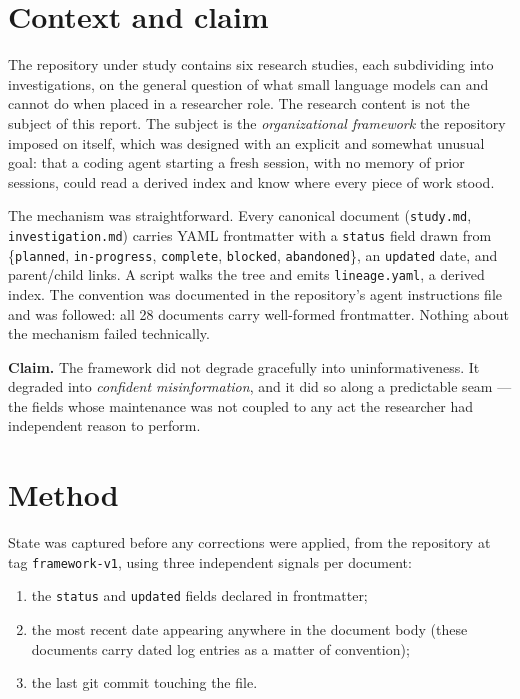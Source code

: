 \documentclass[11pt]{article}
\begin{document}
\section{Context and claim}

The repository under study contains six research studies, each subdividing
into investigations, on the general question of what small language models
can and cannot do when placed in a researcher role. The research content is
not the subject of this report. The subject is the \emph{organizational
framework} the repository imposed on itself, which was designed with an
explicit and somewhat unusual goal: that a coding agent starting a fresh
session, with no memory of prior sessions, could read a derived index and
know where every piece of work stood.

The mechanism was straightforward. Every canonical document
(\texttt{study.md}, \texttt{investigation.md}) carries YAML frontmatter with
a \texttt{status} field drawn from
\{\texttt{planned}, \texttt{in-progress}, \texttt{complete},
\texttt{blocked}, \texttt{abandoned}\}, an \texttt{updated} date, and
parent/child links. A script walks the tree and emits \texttt{lineage.yaml},
a derived index. The convention was documented in the repository's agent
instructions file and was followed: all 28 documents carry well-formed
frontmatter. Nothing about the mechanism failed technically.

\medskip
\noindent
\textbf{Claim.} The framework did not degrade gracefully into
uninformativeness. It degraded into \emph{confident misinformation}, and it
did so along a predictable seam --- the fields whose maintenance was not
coupled to any act the researcher had independent reason to perform.

\section{Method}

State was captured before any corrections were applied, from the repository
at tag \texttt{framework-v1}, using three independent signals per document:

\begin{enumerate}[topsep=3pt,itemsep=1pt]
  \item the \texttt{status} and \texttt{updated} fields declared in
        frontmatter;
  \item the most recent date appearing anywhere in the document body (these
        documents carry dated log entries as a matter of convention);
  \item the last git commit touching the file.
\end{enumerate}
\end{document}
